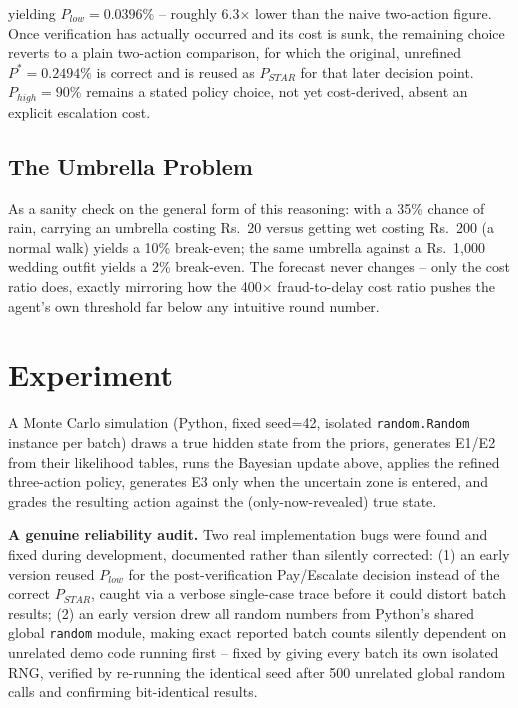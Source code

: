 \documentclass[10pt]{article}
\newcommand{\rs}{\textrm{Rs.\ }}
\begin{document}
yielding $P_{low} = 0.0396\%$ -- roughly 6.3$\times$ lower than the
naive two-action figure. Once verification has actually occurred and
its cost is sunk, the remaining choice reverts to a plain two-action
comparison, for which the original, unrefined $P^*=0.2494\%$ is
correct and is reused as $P_{STAR}$ for that later decision point.
$P_{high}=90\%$ remains a stated policy choice, not yet
cost-derived, absent an explicit escalation cost.

\subsection{The Umbrella Problem}
As a sanity check on the general form of this reasoning: with a 35\%
chance of rain, carrying an umbrella costing \rs 20 versus getting wet
costing \rs 200 (a normal walk) yields a 10\% break-even; the same
umbrella against a \rs 1{,}000 wedding outfit yields a 2\% break-even.
The forecast never changes -- only the cost ratio does, exactly
mirroring how the 400$\times$ fraud-to-delay cost ratio pushes the
agent's own threshold far below any intuitive round number.

\section{Experiment}
\label{sec:experiment}

A Monte Carlo simulation (Python, fixed seed=42, isolated
\texttt{random.Random} instance per batch) draws a true hidden state
from the priors, generates E1/E2 from their likelihood tables, runs
the Bayesian update above, applies the refined three-action policy,
generates E3 only when the uncertain zone is entered, and grades the
resulting action against the (only-now-revealed) true state.

\textbf{A genuine reliability audit.} Two real implementation bugs
were found and fixed during development, documented rather than
silently corrected: (1) an early version reused $P_{low}$ for the
post-verification Pay/Escalate decision instead of the correct
$P_{STAR}$, caught via a verbose single-case trace before it could
distort batch results; (2) an early version drew all random numbers
from Python's shared global \texttt{random} module, making exact
reported batch counts silently dependent on unrelated demo code
running first -- fixed by giving every batch its own isolated RNG,
verified by re-running the identical seed after 500 unrelated global
random calls and confirming bit-identical results.
\end{document}
